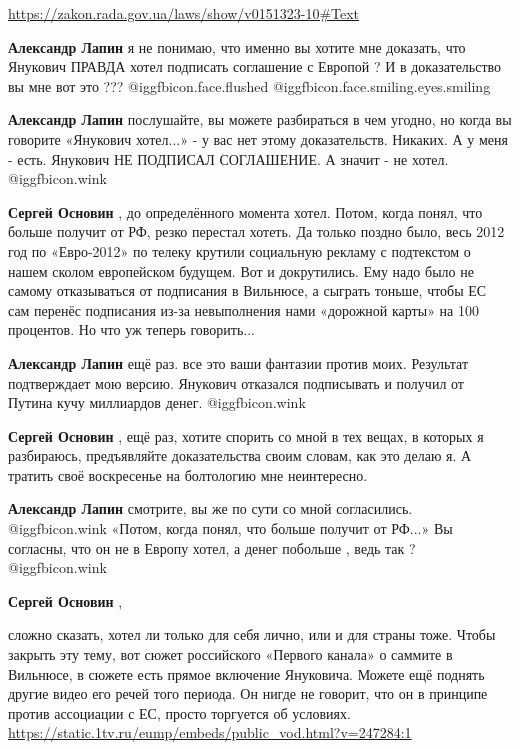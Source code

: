 \begin{itemize}
\begin{itemize}
\url{https://zakon.rada.gov.ua/laws/show/v0151323-10#Text}

\textbf{Александр Лапин} я не понимаю, что именно вы хотите мне доказать, что Янукович ПРАВДА хотел подписать соглашение с Европой ? И в доказательство вы мне вот это ???  @igg{fbicon.face.flushed}  @igg{fbicon.face.smiling.eyes.smiling} 

\textbf{Александр Лапин} послушайте, вы можете разбираться в чем угодно, но когда вы говорите «Янукович хотел...» - у вас нет этому доказательств. Никаких. А у меня - есть. Янукович НЕ ПОДПИСАЛ СОГЛАШЕНИЕ. А значит - не хотел.  @igg{fbicon.wink} 

\textbf{Сергей Основин} , до определённого момента хотел. Потом, когда понял, что больше получит от РФ, резко перестал хотеть. Да только поздно было, весь 2012 год по «Евро-2012» по телеку крутили социальную рекламу с подтекстом о нашем сколом европейском будущем. Вот и докрутились. Ему надо было не самому отказываться от подписания в Вильнюсе, а сыграть тоньше, чтобы ЕС сам перенёс подписания из-за невыполнения нами «дорожной карты» на 100 процентов. Но что уж теперь говорить...

\textbf{Александр Лапин} ещё раз. все это ваши фантазии против моих. Результат подтверждает мою версию. Янукович отказался подписывать и получил от Путина кучу миллиардов денег.  @igg{fbicon.wink} 

\textbf{Сергей Основин} , ещё раз, хотите спорить со мной в тех вещах, в которых я разбираюсь, предъявляйте доказательства своим словам, как это делаю я. А тратить своё воскресенье на болтологию мне неинтересно.

\textbf{Александр Лапин} смотрите, вы же по сути со мной согласились.  @igg{fbicon.wink} 
«Потом, когда понял, что больше получит от РФ...»
Вы согласны, что он не в Европу хотел, а денег побольше , ведь так ?  @igg{fbicon.wink} 

\textbf{Сергей Основин} , 

сложно сказать, хотел ли только для себя лично, или и для страны тоже. Чтобы
закрыть эту тему, вот сюжет российского «Первого канала» о саммите в Вильнюсе,
в сюжете есть прямое включение Януковича. Можете ещё поднять другие видео его
речей того периода. Он нигде не говорит, что он в принципе против ассоциации с
ЕС, просто торгуется об условиях.
\url{https://static.1tv.ru/eump/embeds/public_vod.html?v=247284:1}


\end{itemize}
\end{itemize}
